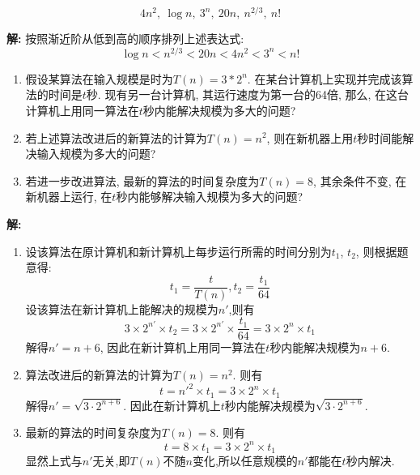 \begin{problem}[习题1.6]

\[
4n^2,{~} \log n,{~} 3^n,{~} 20n,{~} n^{2/3},{~} n!
\]
\end{problem}
\begin{solution}
\textbf{解:} 按照渐近阶从低到高的顺序排列上述表达式:
\[
\log n < n^{2/3} < 20n  < 4n^2 < 3^n < n!
\]
\end{solution}


\begin{problem}[习题1.7]
\begin{enumerate}
\item 假设某算法在输入规模是时为$T(n)=3*2^n$. 在某台计算机上实现并完成该算法的时间是$t$秒. 现有另一台计算机, 其运行速度为第一台的64倍, 那么, 在这台计算机上用同一算法在$t$秒内能解决规模为多大的问题?
\item 若上述算法改进后的新算法的计算为$T(n)=n^2$, 则在新机器上用$t$秒时间能解决输入规模为多大的问题?
\item 若进一步改进算法, 最新的算法的时间复杂度为$T(n)=8$, 其余条件不变, 在新机器上运行, 在$t$秒内能够解决输入规模为多大的问题?
\end{enumerate}
\end{problem}
\begin{solution}
\textbf{解:}
\begin{enumerate}
\item 设该算法在原计算机和新计算机上每步运行所需的时间分别为$t_1$, $t_2$, 则根据题意得:
\[
t_1 = \frac{t}{T(n)}, t_2 = \frac{t_1}{64}
\]
设该算法在新计算机上能解决的规模为$n'$,则有
\[
3\times 2^{n'}\times t_2 = 3\times 2^{n'}\times \frac{t_1}{64} = 3\times 2^{n}\times t_1
\]
解得$n'=n+6$, 因此在新计算机上用同一算法在$t$秒内能解决规模为$n+6$.

\item 算法改进后的新算法的计算为$T(n)=n^2$. 则有
\[
t = n'^2\times t_1 = 3\times 2^{n}\times t_1
\]
解得$n'=\sqrt{3\cdot 2^{n+6}}$. 因此在新计算机上$t$秒内能解决规模为$\sqrt{3\cdot 2^{n+6}}$.

\item 最新的算法的时间复杂度为$T(n)=8$. 则有
\[
t = 8\times t_1 = 3\times 2^n\times t_1
\]
显然上式与$n'$无关,即$T(n)$不随$n$变化,所以任意规模的$n'$都能在$t$秒内解决.

\end{enumerate}
\end{solution}
